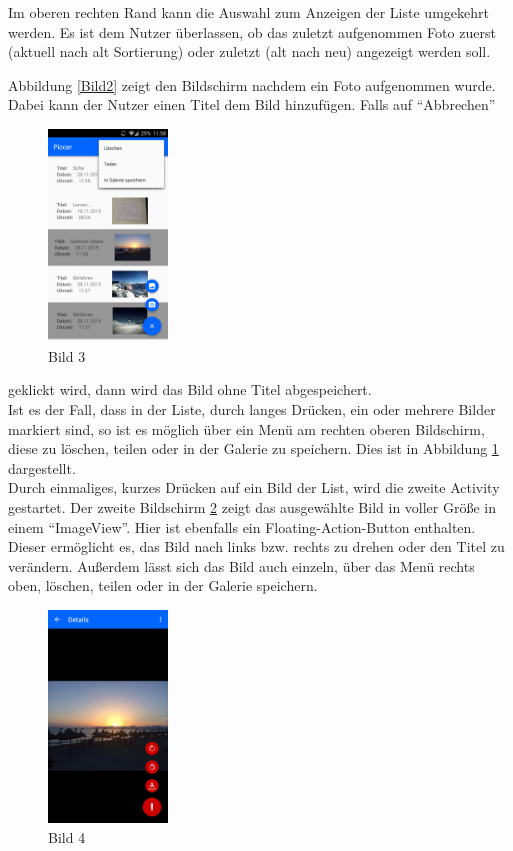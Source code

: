 Im oberen rechten Rand kann die Auswahl zum Anzeigen der Liste umgekehrt werden. Es ist dem Nutzer überlassen, ob das zuletzt aufgenommen Foto zuerst (aktuell nach alt Sortierung) oder zuletzt (alt nach neu) angezeigt werden soll.


Abbildung \ref{Bild2} zeigt den Bildschirm nachdem ein Foto aufgenommen wurde.
Dabei kann der Nutzer einen Titel dem Bild hinzufügen. Falls auf \enquote{Abbrechen}
\begin{figure}
\label{Bild3}
\centering
\includegraphics[width=120px]{../images/bild_3}
\caption{Bild 3}
\end{figure} geklickt wird, dann wird das Bild ohne Titel abgespeichert.\\

Ist es der Fall, dass in der Liste, durch langes Drücken, ein oder mehrere Bilder markiert sind, so ist es möglich über ein Menü am rechten oberen Bildschirm, diese zu löschen, teilen oder in der Galerie zu speichern. Dies ist in Abbildung \ref{Bild3} dargestellt.\\

Durch einmaliges, kurzes Drücken auf ein Bild der List, wird die zweite Activity gestartet. Der zweite Bildschirm \ref{Bild4} zeigt das ausgewählte Bild in voller Größe in einem \enquote{ImageView}. Hier ist ebenfalls ein Floating-Action-Button enthalten. Dieser ermöglicht es, das Bild nach links bzw. rechts zu drehen oder den Titel zu verändern.
Außerdem lässt sich das Bild auch einzeln, über das Menü rechts oben, löschen, teilen oder in der Galerie speichern.




\begin{figure}
\label{Bild4}
\centering
\includegraphics[width=120px]{../images/bild_4}
\caption{Bild 4}
\end{figure}

